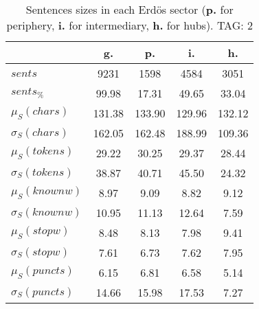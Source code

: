 \begin{table}[h!]
\begin{center}
\begin{tabular}{| l || c | c | c | c |}\hline
 & {\bf g.} & {\bf p.} & {\bf i.} & {\bf h.} \\\hline\hline
$sents$ & 9231  & 1598  & 4584  & 3051 \\
$sents_{\%}$ & 99.98  & 17.31  & 49.65  & 33.04 \\\hline
$\mu_S(chars)$ & 131.38  & 133.90  & 129.96  & 132.12 \\
$\sigma_S(chars)$ & 162.05  & 162.48  & 188.99  & 109.36 \\\hline
$\mu_S(tokens)$ & 29.22  & 30.25  & 29.37  & 28.44 \\
$\sigma_S(tokens)$ & 38.87  & 40.71  & 45.50  & 24.32 \\\hline
$\mu_S(knownw)$ & 8.97  & 9.09  & 8.82  & 9.12 \\
$\sigma_S(knownw)$ & 10.95  & 11.13  & 12.64  & 7.59 \\\hline
$\mu_S(stopw)$ & 8.48  & 8.13  & 7.98  & 9.41 \\
$\sigma_S(stopw)$ & 7.61  & 6.73  & 7.62  & 7.95 \\\hline
$\mu_S(puncts)$ & 6.15  & 6.81  & 6.58  & 5.14 \\
$\sigma_S(puncts)$ & 14.66  & 15.98  & 17.53  & 7.27 \\\hline
\end{tabular}
\caption{Sentences sizes in each Erd\"os sector ({{\bf p.}} for periphery, {{\bf i.}} for intermediary, {{\bf h.}} for hubs). TAG: 2}
\end{center}
\end{table}